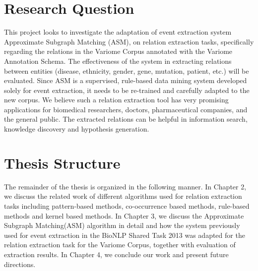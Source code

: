 \section{Research Question}\label{section1.3} %
This project looks to investigate the adaptation of event extraction system Approximate Subgraph Matching (ASM)\cite{liu2013approximate},  on relation extraction tasks, specifically regarding the relations in the Variome Corpus annotated with the Variome Annotation Schema\cite{verspoor2013annotating}. The effectiveness of the system in extracting relations between entities (disease, ethnicity, gender, gene, mutation, patient, etc.) will be evaluated. Since ASM is a supervised, rule-based data mining system developed solely for event extraction, it needs to be re-trained and carefully adapted to the new corpus. We believe such a relation extraction tool has very promising applications for biomedical researchers, doctors, pharmaceutical companies, and the general public. The extracted relations can be helpful in information search, knowledge discovery and hypothesis generation. 
\section{Thesis Structure}
The remainder of the thesis is organized in the following manner. In Chapter 2, we discuss the related work of different algorithms used for relation extraction tasks including pattern-based methods, co-occurrence based methods, rule-based methods and kernel based methods. In Chapter 3, we discuss the Approximate Subgraph Matching(ASM) algorithm in detail and how the system previously used for event extraction in the BioNLP Shared Task 2013 was adapted for the relation extraction task for the Variome Corpus, together with evaluation of extraction results. In Chapter 4, we conclude our work and present future directions.

